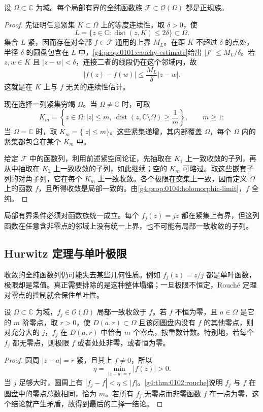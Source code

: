 \begin{theorem}[Montel]\label{g4:thm:0104:montel}
	设 \(\Omega\subset\mathbb C\) 为域。每个局部有界的全纯函数族 \(\mathcal F\subset\mathcal O(\Omega)\) 都是正规族。
\end{theorem}
\begin{proof}
	先证明任意紧集 \(K\subset\Omega\) 上的等度连续性。取 \(\delta>0\)，使
	\[
		L=\{z\in\mathbb C:\operatorname{dist}(z,K)\le2\delta\}
		\subset\Omega.
	\]
	集合 \(L\) 紧，因而存在对全部 \(f\in\mathcal F\) 通用的上界 \(M_L\)。在距 \(K\) 不超过 \(\delta\) 的点处，半径 \(\delta\) 的圆盘包含在 \(L\) 中，\cref{g4:prop:0101:cauchy-estimate}给出 \(|f'|\le M_L/\delta\)。若 \(z,w\in K\) 且 \(|z-w|<\delta\)，连接二者的线段仍在这个邻域内，故
	\[
		|f(z)-f(w)|
		\le\frac{M_L}{\delta}|z-w|.
	\]
	这就是在 \(K\) 上与 \(f\) 无关的连续性估计。

	现在选择一列紧集穷竭 \(\Omega\)。当 \(\Omega\ne\mathbb C\) 时，可取
	\[
		K_m=\left\{z\in\Omega:|z|\le m,\
		\operatorname{dist}(z,\mathbb C\setminus\Omega)\ge\frac1m\right\},
		\qquad m\ge1;
	\]
	当 \(\Omega=\mathbb C\) 时，取 \(K_m=\{|z|\le m\}\)。这些紧集递增，其内部覆盖 \(\Omega\)，每个 \(\Omega\) 内的紧集都包含在某个 \(K_m\) 中。

	给定 \(\mathcal F\) 中的函数列，利用前述紧空间论证，先抽取在 \(K_1\) 上一致收敛的子列，再从中抽取在 \(K_2\) 上一致收敛的子列，如此继续；空的 \(K_m\) 可略过。取这些嵌套子列的对角子列，它在每个 \(K_m\) 上一致收敛。各个极限在交集上一致，因而定义 \(\Omega\) 上的函数 \(f\)，且所得收敛是局部一致的。由\cref{g4:prop:0104:holomorphic-limit}，\(f\) 全纯。
\end{proof}

局部有界条件必须对函数族统一成立。每个 \(f_j(z)=jz\) 都在紧集上有界，但这列函数在任意含非零点的邻域上没有统一上界，也不可能有局部一致收敛的子列。

\subsection{Hurwitz 定理与单叶极限}
\label{g4:subsec:0104:02}

收敛的全纯函数列仍可能失去某些几何性质。例如 \(f_j(z)=z/j\) 都是单叶函数，极限却是常值。真正需要排除的是这种整体塌缩；一旦极限不恒定，Rouché 定理对零点的控制就会保住单叶性。

\begin{theorem}[Hurwitz]\label{g4:thm:0104:hurwitz}
	设 \(\Omega\subset\mathbb C\) 为域，\(f_j\in\mathcal O(\Omega)\) 局部一致收敛于 \(f\)。若 \(f\) 不恒为零，且 \(a\in\Omega\) 是它的 \(m\) 阶零点，取 \(r>0\)，使 \(\overline{D(a,r)}\subset\Omega\) 且该闭圆盘内没有 \(f\) 的其他零点，则对充分大的 \(j\)，\(f_j\) 在 \(D(a,r)\) 中恰有 \(m\) 个零点，按重数计数。特别地，若每个 \(f_j\) 都无零点，则极限 \(f\) 或者处处非零，或者恒为零。
\end{theorem}
\begin{proof}
	圆周 \(|z-a|=r\) 紧，且其上 \(f\ne0\)，所以
	\[
		\eta=\min_{|z-a|=r}|f(z)|>0.
	\]
	当 \(j\) 足够大时，圆周上有 \(|f_j-f|<\eta\le|f|\)。\cref{g4:thm:0102:rouche}说明 \(f_j\) 与 \(f\) 在圆盘中的零点总数相同，恰为 \(m\)。若所有 \(f_j\) 无零点而非零函数 \(f\) 在一点为零，这个结论就产生矛盾，故得到最后的二择一结论。
\end{proof}

